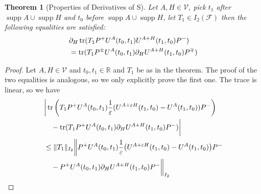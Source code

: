 \documentclass[b5paper,draft,openbib,12pt]{memoir}
\newtheorem{Thm}[Def]{Theorem}
\DeclareMathOperator*{\supp}{supp}
\DeclareMathOperator{\tr}{tr}
\begin{document}
\begin{Thm}[Properties of Derivatives of S]
Let  \(A,H\in\mathcal{V}\), pick \(t_1\) 
after \(\supp A\cup\supp H\) and \(t_0\)
before \(\supp A\cup\supp H\), 
let \(T_1\in I_2(\mathcal{F})\) 
then the following equalities are satisfied:
\begin{align}\notag
&\partial_{H} \tr(T_1 P^+ U^{A}(t_0,t_1)U^{A+H}(t_1,t_0)P^-)\\\label{pull derivative into trace}
&= \tr(T_1 P^\pm U^{A}(t_0,t_1)\partial_{H} U^{A+H}(t_1,t_0)P^\mp )
\end{align}
\end{Thm}
\begin{proof}
Let \(A,H\in\mathcal{V}\) and \(t_0,t_1\in\mathbb{R}\)
and \(T_1\) be 
as in the theorem. The proof of the two equalities is 
analogous, so we only explicitly prove the first one.
The trace is linear, so we have
\begin{align}\notag
&\bigg|
\tr\left(T_1 P^+ U^{A}(t_0,t_1) 
\frac{1}{\varepsilon}(U^{A+\varepsilon H}(t_1,t_0)-U^{A}(t_1,t_0))P^-\right)\\
&\quad- \tr(T_1 P^+ U^{A}(t_0,t_1)\partial_{H}U^{A+H}(t_1,t_0)P^-)\bigg|\\\notag
&\le \|T_1\|_{I_2} \bigg\|  P^+ U^{A}(t_0,t_1) 
\frac{1}{\varepsilon}\big(U^{A+\varepsilon H}(t_1,t_0)-U^{A}(t_1,t_0)\big)P^- \\\label{derivative trace estimate}
&\quad-P^+ U^{A}(t_0,t_1)\partial_{H}U^{A+H}(t_1,t_0)P^-\bigg\|_{I_2}
\end{align}


\end{proof}
\end{document}

